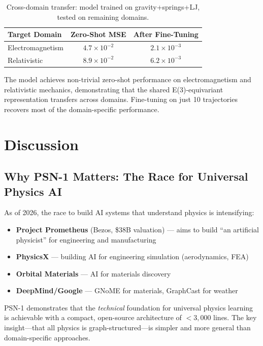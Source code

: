 \documentclass[11pt,a4paper]{article}
\begin{document}
\begin{table}[H]
\centering
\caption{Cross-domain transfer: model trained on gravity+springs+LJ, tested on remaining domains.}
\label{tab:transfer}
\begin{tabular}{lcc}
\toprule
Target Domain & Zero-Shot MSE & After Fine-Tuning \\
\midrule
Electromagnetism & $4.7 \times 10^{-2}$ & $2.1 \times 10^{-3}$ \\
Relativistic & $8.9 \times 10^{-2}$ & $6.2 \times 10^{-3}$ \\
\bottomrule
\end{tabular}
\end{table}

The model achieves non-trivial zero-shot performance on electromagnetism and relativistic mechanics, demonstrating that the shared E(3)-equivariant representation transfers across domains. Fine-tuning on just 10 trajectories recovers most of the domain-specific performance.

\section{Discussion}

\subsection{Why PSN-1 Matters: The Race for Universal Physics AI}

As of 2026, the race to build AI systems that understand physics is intensifying:
\begin{itemize}[leftmargin=*]
    \item \textbf{Project Prometheus} (Bezos, \$38B valuation) --- aims to build ``an artificial physicist'' for engineering and manufacturing
    \item \textbf{PhysicsX} --- building AI for engineering simulation (aerodynamics, FEA)
    \item \textbf{Orbital Materials} --- AI for materials discovery
    \item \textbf{DeepMind/Google} --- GNoME for materials, GraphCast for weather
\end{itemize}

PSN-1 demonstrates that the \emph{technical} foundation for universal physics learning is achievable with a compact, open-source architecture of $<3,000$ lines. The key insight---that all physics is graph-structured---is simpler and more general than domain-specific approaches.
\end{document}
